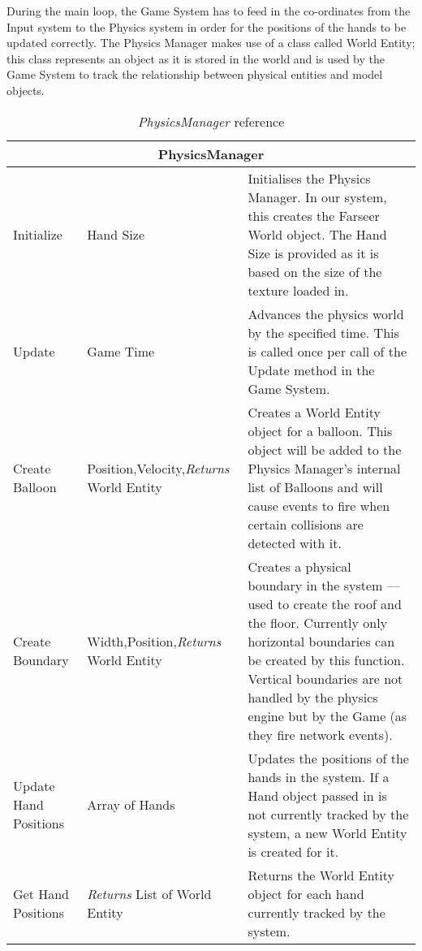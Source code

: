 During the main loop, the Game System has to feed in the co-ordinates from the
Input system to the Physics system in order for the positions of the hands to 
be updated correctly. The Physics Manager makes use of a class called World
Entity; this class represents an object as it is stored in the world and is 
used by the Game System to track the relationship between physical entities and
model objects.

\begin{longtable}{|p{4.5cm}|p{3.5cm}|p{7.7cm}|}
\caption{\emph{PhysicsManager} reference \label{PhysicsManagerRef}}
\\
\hline
\multicolumn{3}{|c|}{PhysicsManager} \\ \hline

Initialize & Hand Size &
Initialises the Physics Manager. In our system, this creates the Farseer World
object. The Hand Size is provided as it is based on the size of the texture 
loaded in. \\ \hline

Update & Game Time &
Advances the physics world by the specified time. This is called once per call
of the Update method in the Game System.\\ \hline

Create Balloon & Position,\newline Velocity,\newline \emph{Returns} World Entity &
Creates a World Entity object for a balloon. This object will be added to the 
Physics Manager's internal list of Balloons and will cause events to fire when
certain collisions are detected with it.\\ \hline

Create Boundary & Width,\newline Position,\newline \emph{Returns} World Entity &
Creates a physical boundary in the system --- used to create the roof and the 
floor. Currently only horizontal boundaries can be created by this function.
Vertical boundaries are not handled by the physics engine but by the Game (as 
they fire network events).\\ \hline

Update Hand Positions & Array of Hands &
Updates the positions of the hands in the system. If a Hand object passed in 
is not currently tracked by the system, a new World Entity is created for it.
\\ \hline

Get Hand Positions & \emph{Returns} List of World Entity &
Returns the World Entity object for each hand currently tracked by the system.
\\ \hline


\end{longtable}
